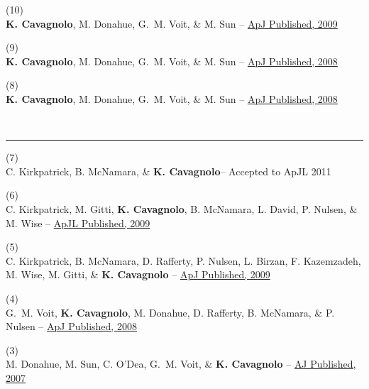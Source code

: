 \documentclass[12pt]{cv}
\begin{document}
(10) {}\\
{\bf K. Cavagnolo}, M. Donahue, G.~M. Voit, \& M. Sun -- 
\href{http://adsabs.harvard.edu/abs/2009ApJS..182...12C}{ApJ Published, 2009}

(9) {}\\
{\bf K. Cavagnolo}, M. Donahue, G.~M. Voit, \& M. Sun -- 
\href{http://adsabs.harvard.edu/abs/2008ApJ...683L.107C}{ApJ Published, 2008}

(8) {}\\
{\bf K. Cavagnolo}, M. Donahue, G.~M. Voit, \& M. Sun --
\href{http://adsabs.harvard.edu/abs/2008ApJ...682..821C}{ApJ Published, 2008}

{\large{}}\vspace{-0.3cm}\\
\rule{\linewidth}{0.5pt}
(7) {}\\
C. Kirkpatrick, B. McNamara, \& {\bf K. Cavagnolo}--
Accepted to ApJL 2011

(6) {}\\
C. Kirkpatrick, M. Gitti, {\bf K. Cavagnolo}, B. McNamara, L. David, P. Nulsen, \& M. Wise --
\href{http://adsabs.harvard.edu/abs/2009arXiv0909.2252K}{ApJL Published, 2009}

(5) {}\\
C. Kirkpatrick, B. McNamara, D. Rafferty, P. Nulsen, L. Birzan, F. Kazemzadeh, M. Wise, M. Gitti, \& {\bf K. Cavagnolo} --
\href{http://adsabs.harvard.edu/abs/2009ApJ...697..867K}{ApJ Published, 2009}

(4) {}\\
G.~M. Voit, {\bf K. Cavagnolo}, M. Donahue, D. Rafferty, B. McNamara, \& P. Nulsen --
\href{http://adsabs.harvard.edu/abs/2008ApJ...681L...5V}{ApJ Published, 2008}

(3) {}\\
M. Donahue, M. Sun, C. O'Dea, G.~M. Voit, \& {\bf K. Cavagnolo} --
\href{http://adsabs.harvard.edu/abs/2007AJ....134...14D}{AJ Published, 2007}
\end{document}
